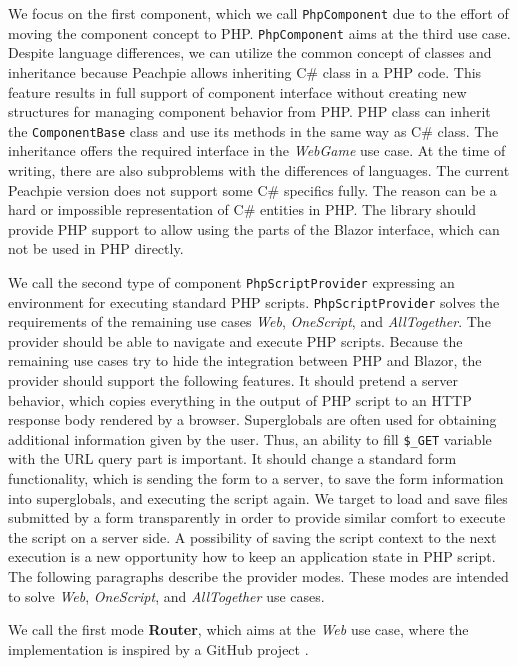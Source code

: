 \par
We focus on the first component, which we call \texttt{PhpComponent} due to the effort of moving the component concept to PHP.
\texttt{PhpComponent} aims at the third use case.
Despite language differences, we can utilize the common concept of classes and inheritance because Peachpie allows inheriting C\# class in a PHP code.
This feature results in full support of component interface without creating new structures for managing component behavior from PHP.
PHP class can inherit the \texttt{ComponentBase} class and use its methods in the same way as C\# class.
The inheritance offers the required interface in the \textit{WebGame} use case.
At the time of writing, there are also subproblems with the differences of languages.
The current Peachpie version does not support some C\# specifics fully.
The reason can be a hard or impossible representation of C\# entities in PHP.
The library should provide PHP support to allow using the parts of the Blazor interface, which can not be used in PHP directly.
\par
We call the second type of component \texttt{PhpScriptProvider} expressing an environment for executing standard PHP scripts.
\texttt{PhpScriptProvider} solves the requirements of the remaining use cases \textit{Web}, \textit{OneScript}, and \textit{AllTogether}.
The provider should be able to navigate and execute PHP scripts.
Because the remaining use cases try to hide the integration between PHP and Blazor, the provider should support the following features.
It should pretend a server behavior, which copies everything in the output of PHP script to an HTTP response body rendered by a browser.
Superglobals are often used for obtaining additional information given by the user.
Thus, an ability to fill \texttt{\$\_GET} variable with the URL query part is important.
It should change a standard form functionality, which is sending the form to a server, to save the form information into superglobals, and executing the script again.
We target to load and save files submitted by a form transparently in order to provide similar comfort to execute the script on a server side.
A possibility of saving the script context to the next execution is a new opportunity how to keep an application state in PHP script.
The following paragraphs describe the provider modes.
These modes are intended to solve \textit{Web}, \textit{OneScript}, and \textit{AllTogether} use cases. 
\par
We call the first mode \textbf{Router}, which aims at the \textit{Web} use case, where the implementation is inspired by a GitHub project \cite{online:customRouter}.
